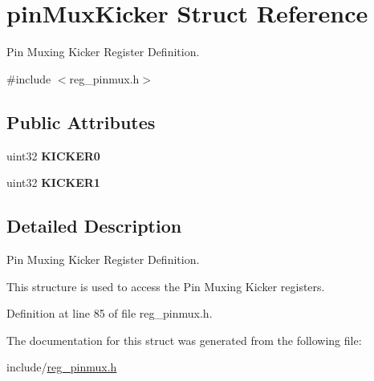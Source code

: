 \hypertarget{structpinMuxKicker}{}\section{pin\+Mux\+Kicker Struct Reference}
\label{structpinMuxKicker}


Pin Muxing Kicker Register Definition.  




{\ttfamily \#include $<$reg\+\_\+pinmux.\+h$>$}

\subsection*{Public Attributes}
\begin{DoxyCompactItemize}
\item 
\mbox{\label{structpinMuxKicker_aff20c207f8440c3f88332cf10f9fbc46}} 
uint32 {\bfseries K\+I\+C\+K\+E\+R0}
\item 
\mbox{\label{structpinMuxKicker_a6203ea35a9b68cdb3056e1cfd19840d4}} 
uint32 {\bfseries K\+I\+C\+K\+E\+R1}
\end{DoxyCompactItemize}


\subsection{Detailed Description}
Pin Muxing Kicker Register Definition. 

This structure is used to access the Pin Muxing Kicker registers. 

Definition at line 85 of file reg\+\_\+pinmux.\+h.



The documentation for this struct was generated from the following file\+:\begin{DoxyCompactItemize}
\item 
include/\mbox{\hyperlink{reg__pinmux_8h}{reg\+\_\+pinmux.\+h}}\end{DoxyCompactItemize}
